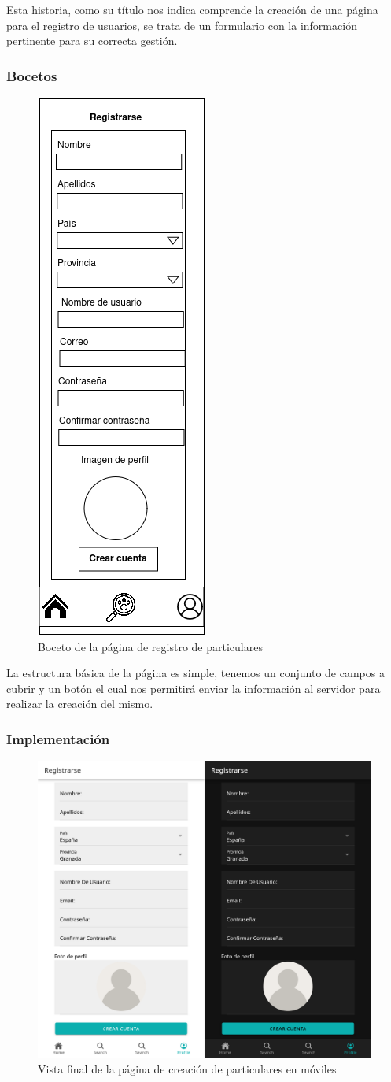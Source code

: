 Esta historia, como su título nos indica comprende la creación de una página para el registro de usuarios, se trata de un formulario con la información pertinente para su correcta gestión.\\

\subsubsection{Bocetos}
\begin{figure}[H]
	\centering
	\includegraphics[width=0.24\linewidth]{"sprint 2/hu5/registro_particulares"}
	\caption{Boceto de la página de registro de particulares}
	\label{fig:registroparticulares}
\end{figure}

La estructura básica de la página es simple, tenemos un conjunto de campos a cubrir y un botón el cual nos permitirá enviar la información al servidor para realizar la creación del mismo. \\

\subsubsection{Implementación}

\begin{figure}[H]
	\centering
	\includegraphics[width=0.7\linewidth]{"sprint 2/hu5/impRegistroParticulares"}
	\caption{Vista final de la página de creación de particulares en móviles}
	\label{fig:impregistroparticulares}
\end{figure}

